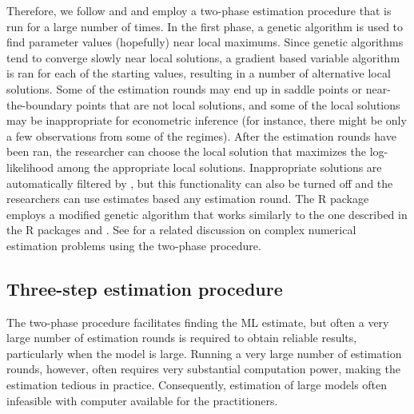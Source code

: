 \documentclass[nojss]{jss}
\begin{document}
Therefore, we follow \cite{Meitz+Preve+Saikkonen:2023} and \cite{Virolainen:2022} and employ a two-phase estimation procedure that is run for a large number of times. In the first phase, a genetic algorithm is used to find parameter values (hopefully) near local maximums. Since genetic algorithms tend to converge slowly near local solutions, a gradient based variable algorithm \cite[algorithm 21, implemented by \citealp{R}]{Nash:1990} is ran for each of the starting values, resulting in a number of alternative local solutions. Some of the estimation rounds may end up in saddle points or near-the-boundary points that are not local solutions, and some of the local solutions may be  inappropriate for econometric inference (for instance, there might be only a few observations from some of the regimes). After the estimation rounds have been ran, the researcher can choose the local solution that maximizes the log-likelihood among the appropriate local solutions. Inappropriate solutions are automatically filtered by , but this functionality can also be turned off and the researchers can use estimates based any estimation round. The R package  employs a modified genetic algorithm that works similarly to the one described in the R packages  \citep{uGMAR} and  \citep{gmvarkit} \citep[the genetic algorithm and implemented in former is briefly described in][]{Virolainen:2022}. See \citet[Chapter~3]{Virolainen2:2022} for a related discussion on complex numerical estimation problems using the two-phase procedure.

\subsection{Three-step estimation procedure}\label{sec:three-step}

The two-phase procedure facilitates finding the ML estimate, but often a very large number of estimation rounds is required to obtain reliable results, particularly when the model is large. Running a very large number of estimation rounds, however, often requires very substantial computation power, making the estimation tedious in practice. Consequently, estimation of large models often infeasible with computer available for the practitioners.
\end{document}
